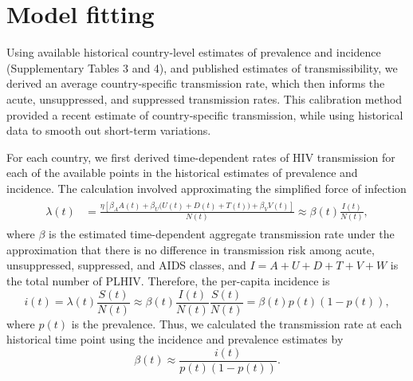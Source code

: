 \documentclass{article}
\begin{document}
\section{Model fitting}
\label{model_fitting}

Using available historical country-level estimates of prevalence and
incidence (Supplementary Tables 3 and 4), and published estimates of
transmissibility\cite{Wawer2005-us, Donnell2010-xo, Hughes2012-so,
  Skarbinski2015-ni},
we derived an average country-specific transmission rate, which then
informs the acute, unsuppressed, and suppressed transmission rates.
This calibration method provided a recent estimate of country-specific
transmission, while using historical data to smooth out short-term
variations.

For each country, we first derived time-dependent rates of HIV
transmission for each of the available points in the historical
estimates of prevalence and incidence.  The calculation involved
approximating the simplified force of infection
\begin{align}
  \label{foi}
  \begin{split}
    \lambda(t) &= \frac{\eta \left[\beta_{A} A(t)
        + \beta_{U} \big(U(t) + D(t) + T(t)\big) +
        \beta_{V} V(t)\right]}{N(t)}
    \approx  \beta(t) \frac{I(t)}{N(t)},
  \end{split}
\end{align}
where $\beta$ is the estimated time-dependent aggregate transmission
rate under the approximation that there is no difference in
transmission risk among acute, unsuppressed, suppressed, and AIDS
classes, and $I = A + U + D + T + V + W$ is the total number of PLHIV.
Therefore, the per-capita incidence is
\begin{equation}
i(t) = \lambda(t) \frac{S(t)}{N(t)}
\approx \beta(t) \frac{I(t)}{N(t)} \frac{S(t)}{N(t)} =\beta(t) p(t) (1-p(t)),
\end{equation}
where $p(t)$ is the prevalence. Thus, we calculated the transmission
rate at each historical time point using the incidence and prevalence
estimates by
\begin{equation}
  \label{trans_rate}
  \beta(t) \approx \frac{i(t)}{p(t)(1-p(t))}.
\end{equation}
\end{document}
